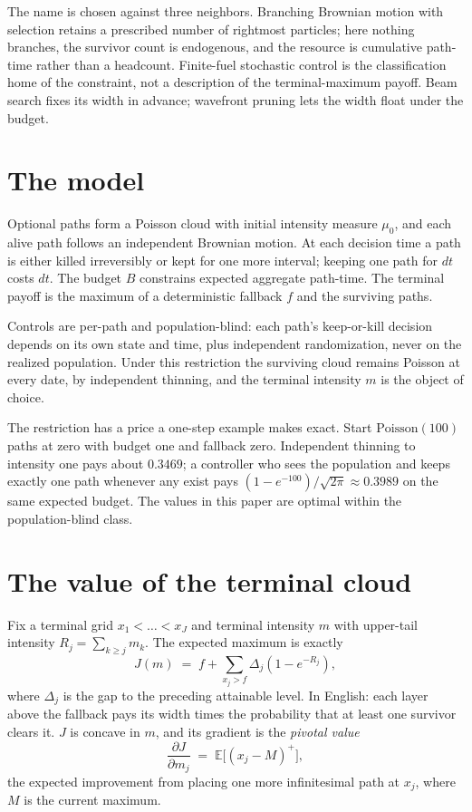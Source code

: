 \documentclass[11pt]{article}
\theoremstyle{itheads}
\newcommand{\E}{\mathbb{E}}
\begin{document}
The name is chosen against three neighbors. Branching Brownian motion with
selection retains a prescribed number of rightmost particles; here nothing
branches, the survivor count is endogenous, and the resource is cumulative
path-time rather than a headcount. Finite-fuel stochastic control is the
classification home of the constraint, not a description of the
terminal-maximum payoff. Beam search fixes its width in advance; wavefront
pruning lets the width float under the budget.

\section{The model}

Optional paths form a Poisson cloud with initial intensity measure
$\mu_0$, and each alive path follows an independent Brownian motion. At
each decision time a path is either killed irreversibly or kept for one
more interval; keeping one path for $dt$ costs $dt$. The budget $B$
constrains expected aggregate path-time. The terminal payoff is the
maximum of a deterministic fallback $f$ and the surviving paths.

Controls are per-path and population-blind: each path's keep-or-kill
decision depends on its own state and time, plus independent
randomization, never on the realized population. Under this restriction
the surviving cloud remains Poisson at every date, by independent
thinning, and the terminal intensity $m$ is the object of choice.

The restriction has a price a one-step example makes exact. Start
$\mathrm{Poisson}(100)$ paths at zero with budget one and fallback zero.
Independent thinning to intensity one pays about $0.3469$; a controller
who sees the population and keeps exactly one path whenever any exist
pays $(1-e^{-100})/\sqrt{2\pi} \approx 0.3989$ on the same expected budget. The
values in this paper are optimal within the population-blind class.

\section{The value of the terminal cloud}

Fix a terminal grid $x_1 < \dots < x_J$ and terminal intensity $m$ with
upper-tail intensity $R_j = \sum_{k \ge j} m_k$. The expected maximum is
exactly
\begin{equation}
J(m) \;=\; f + \sum_{x_j > f} \Delta_j \left(1 - e^{-R_j}\right),
\label{eq:layercake}
\end{equation}
where $\Delta_j$ is the gap to the preceding attainable level. In
English: each layer above the fallback pays its width times the
probability that at least one survivor clears it. $J$ is concave in $m$,
and its gradient is the \emph{pivotal value}
\begin{equation}
\frac{\partial J}{\partial m_j} \;=\; \E\big[(x_j - M)^+\big],
\label{eq:pivotal}
\end{equation}
the expected improvement from placing one more infinitesimal path at
$x_j$, where $M$ is the current maximum.
\end{document}
